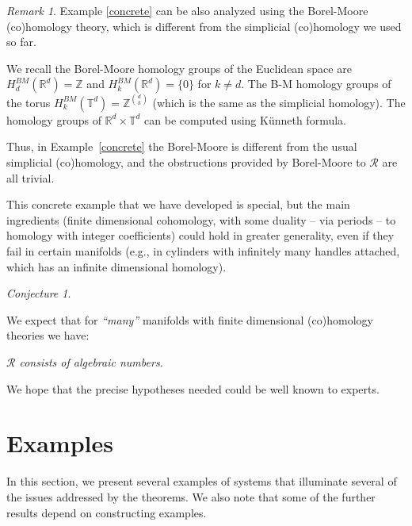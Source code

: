 \documentclass[11pt]{amsart}
\theoremstyle{definition}
\theoremstyle{remark}
\newtheorem{rem}[thm]{Remark}
\newtheorem{conjecture}[thm]{Conjecture}
\numberwithin{equation}{section}
\newcommand{\R}{\mathbb R}
\newcommand{\T}{\mathbb T}
\newcommand{\Z}{\mathbb Z}
\begin{document}
\begin{rem}\label{rem:Borel_Moore}
  Example \ref{concrete}  can be also analyzed using the
  Borel-Moore (co)homology theory, which is different from
  the simplicial (co)homology we used so far.

  We recall the Borel-Moore  homology groups of the Euclidean space
  are $H^{BM}_d(\R^d) = \Z$
  and $H^{BM}_k( \R^d) =  \{0\}$ for $k\neq d$. The B-M homology  groups of
  the torus
$H^{BM}_k(\T^d)=\Z^{d\choose{k} }$
  (which is the same as the simplicial  homology).  The  homology
  groups of $\R^d \times \T^d$ can be computed using
  K\"unneth formula.

  Thus, in Example~\ref{concrete}
  the Borel-Moore is different from the usual simplicial
  (co)homology, and the obstructions provided by Borel-Moore to
  $\mathcal{R}$  are all   trivial.



This concrete example that
we have developed is special, but the main
ingredients (finite dimensional cohomology, with some
duality -- via periods -- to homology with integer coefficients)
could hold in greater generality, even if they fail in certain manifolds
(e.g.,  in cylinders with infinitely many handles attached, which
has an infinite dimensional homology).

\begin{conjecture}\label{rem:duality1}

We expect that for \emph{``many''}  manifolds
with finite dimensional (co)homology theories we have:
\begin{center}
\em $\mathcal{R}$ consists of algebraic numbers.
\end{center}

\end{conjecture}

We hope that the precise hypotheses needed could be
well known to experts.
\end{rem}




\section{Examples}\label{sec:examples}



In this section, we present several examples of systems
that illuminate several of the issues addressed by the theorems.
We also note that some of the further  results  depend on
constructing examples.
\end{document}
